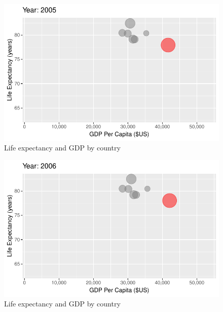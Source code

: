 \documentclass[
  letterpaper,
  DIV=11,
  numbers=noendperiod]{scrreport}
\theoremstyle{definition}
\theoremstyle{remark}
\begin{document}
\begin{figure}

{\centering \includegraphics{index_files/figure-pdf/fig-anim-country-97.pdf}

}

\caption{\label{fig-anim-country-97}Life expectancy and GDP by country}

\end{figure}

\begin{figure}

{\centering \includegraphics{index_files/figure-pdf/fig-anim-country-98.pdf}

}

\caption{\label{fig-anim-country-98}Life expectancy and GDP by country}

\end{figure}
\end{document}
